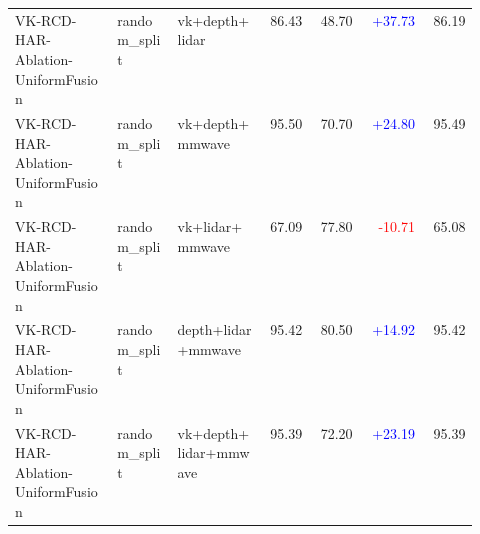 \begin{longtable}{p{0.22\linewidth}p{0.13\linewidth}p{0.19\linewidth}rrrr}
VK-RCD-HAR-Ablation-UniformFusion & random\_split & vk+depth+lidar & 86.43 & 48.70 & \textcolor{blue}{+37.73} & 86.19\\
VK-RCD-HAR-Ablation-UniformFusion & random\_split & vk+depth+mmwave & 95.50 & 70.70 & \textcolor{blue}{+24.80} & 95.49\\
VK-RCD-HAR-Ablation-UniformFusion & random\_split & vk+lidar+mmwave & 67.09 & 77.80 & \textcolor{red}{-10.71} & 65.08\\
VK-RCD-HAR-Ablation-UniformFusion & random\_split & depth+lidar+mmwave & 95.42 & 80.50 & \textcolor{blue}{+14.92} & 95.42\\
VK-RCD-HAR-Ablation-UniformFusion & random\_split & vk+depth+lidar+mmwave & 95.39 & 72.20 & \textcolor{blue}{+23.19} & 95.39\\
\bottomrule
\end{longtable}
